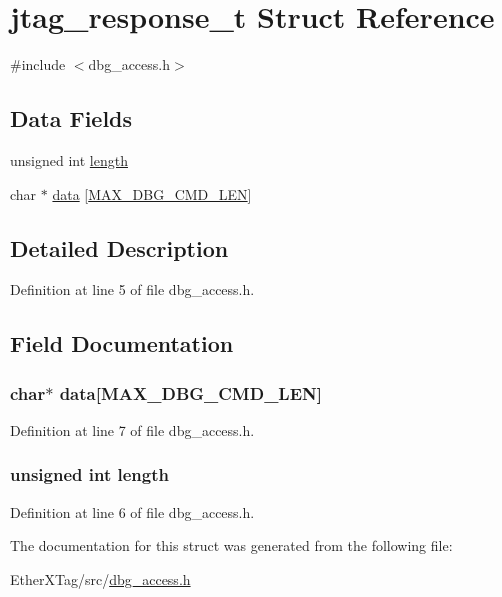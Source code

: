 \hypertarget{structjtag__response__t}{\section{jtag\-\_\-response\-\_\-t Struct Reference}
\label{structjtag__response__t}
}


{\ttfamily \#include $<$dbg\-\_\-access.\-h$>$}

\subsection*{Data Fields}
\begin{DoxyCompactItemize}
\item 
unsigned int \hyperlink{structjtag__response__t_ac8d42bcd4a44e078047ccd7291059238}{length}
\item 
char $\ast$ \hyperlink{structjtag__response__t_a9e58a401fae91865c68ca3136c23808a}{data} \mbox{[}\hyperlink{dbg__cmd_8h_abe6cfb003699e267c6bb15e549e269a4}{M\-A\-X\-\_\-\-D\-B\-G\-\_\-\-C\-M\-D\-\_\-\-L\-E\-N}\mbox{]}
\end{DoxyCompactItemize}


\subsection{Detailed Description}


Definition at line 5 of file dbg\-\_\-access.\-h.



\subsection{Field Documentation}
\hypertarget{structjtag__response__t_a9e58a401fae91865c68ca3136c23808a}{
\subsubsection[{data}]{\setlength{\rightskip}{0pt plus 5cm}char$\ast$ data\mbox{[}{\bf M\-A\-X\-\_\-\-D\-B\-G\-\_\-\-C\-M\-D\-\_\-\-L\-E\-N}\mbox{]}}}\label{structjtag__response__t_a9e58a401fae91865c68ca3136c23808a}


Definition at line 7 of file dbg\-\_\-access.\-h.

\hypertarget{structjtag__response__t_ac8d42bcd4a44e078047ccd7291059238}{
\subsubsection[{length}]{\setlength{\rightskip}{0pt plus 5cm}unsigned int length}}\label{structjtag__response__t_ac8d42bcd4a44e078047ccd7291059238}


Definition at line 6 of file dbg\-\_\-access.\-h.



The documentation for this struct was generated from the following file\-:\begin{DoxyCompactItemize}
\item 
Ether\-X\-Tag/src/\hyperlink{dbg__access_8h}{dbg\-\_\-access.\-h}\end{DoxyCompactItemize}
